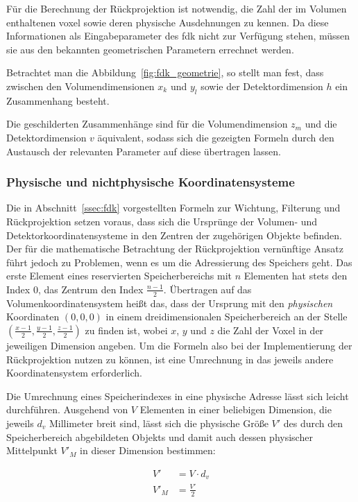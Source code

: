 Für die Berechnung der Rückprojektion ist notwendig, die Zahl der im Volumen enthaltenen \gls{voxel} sowie deren
physische Ausdehnungen zu kennen. Da diese Informationen als Eingabeparameter des \gls{fdk} nicht zur Verfügung stehen,
müssen sie aus den bekannten geometrischen Parametern errechnet werden.

Betrachtet man die Abbildung~\ref{fig:fdk_geometrie}, so stellt man fest, dass zwischen den Volumendimensionen $x_k$ und
$y_l$ sowie der Detektordimension $h$ ein Zusammenhang besteht.

Die geschilderten Zusammenhänge sind für die Volumendimension $z_m$ und die Detektordimension $v$ äquivalent, sodass
sich die gezeigten Formeln durch den Austausch der relevanten Parameter auf diese übertragen lassen.

\subsubsection{Physische und nichtphysische Koordinatensysteme}\label{sssec:phys_coord}

Die in Abschnitt~\ref{ssec:fdk} vorgestellten Formeln zur Wichtung, Filterung und Rückprojektion setzen voraus, dass
sich die Ursprünge der Volumen- und Detektorkoordinatensysteme in den Zentren der zugehörigen Objekte befinden. Der für
die mathematische Betrachtung der Rückprojektion vernünftige Ansatz führt jedoch zu Problemen, wenn es um die
Adressierung des Speichers geht. Das erste Element eines reservierten Speicherbereichs mit $n$ Elementen hat stets den
Index $0$, das Zentrum den Index $\frac{n - 1}{2}$. Übertragen auf das Volumenkoordinatensystem heißt das, dass der
Ursprung mit den \textit{physischen} Koordinaten $(0, 0, 0)$ in einem dreidimensionalen Speicherbereich an der Stelle
$(\frac{x - 1}{2}, \frac{y - 1}{2}, \frac{z - 1}{2})$ zu finden ist, wobei $x$, $y$ und $z$ die Zahl der Voxel in der
jeweiligen Dimension angeben. Um die Formeln also bei der Implementierung der Rückprojektion nutzen zu können, ist eine
Umrechnung in das jeweils andere Koordinatensystem erforderlich.

Die Umrechnung eines Speicherindexes in eine physische Adresse lässt sich leicht durchführen. Ausgehend von $V$
Elementen in einer beliebigen Dimension, die jeweils $d_v$ Millimeter breit sind, lässt sich die physische Größe $V'$
des durch den Speicherbereich abgebildeten Objekts und damit auch dessen physischer Mittelpunkt $V'_M$ in dieser
Dimension bestimmen:

\begin{equation}
    \begin{aligned}
        V' &= V \cdot d_v\\
        V'_M &= \frac{V'}{2}
    \end{aligned}
\end{equation}

